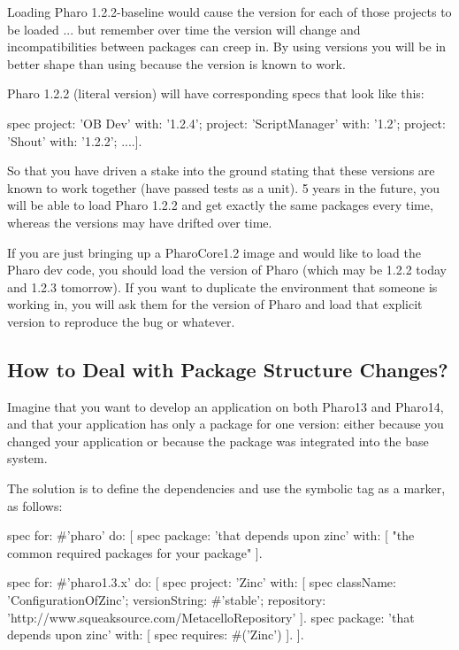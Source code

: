 \documentclass[a4paper,10pt,twoside]{book}
\begin{document}
Loading Pharo 1.2.2-baseline would cause the  version for each of those projects to be loaded ... 
but remember over time the  version will change and incompatibilities between packages can creep in. 
By using  versions you will be in better shape than using  because the  version is known to work.

Pharo 1.2.2 (literal version) will have corresponding specs that look like this:

\begin{code}{}
 spec
    project: 'OB Dev' with: '1.2.4';
    project: 'ScriptManager' with: '1.2';
    project: 'Shout' with: '1.2.2';
    ....].
\end{code}

So that you have driven a stake into the ground stating that these versions are known to work together (have passed tests as a unit). 5 years in the future, you will be able to load Pharo 1.2.2 and get exactly the same packages every time, whereas the  versions may have drifted over time.

If you are just bringing up a PharoCore1.2 image and would like to load the Pharo dev code, you should load the  version of Pharo (which may be 1.2.2 today and 1.2.3 tomorrow).
If you want to duplicate the environment that someone is working in, you will ask them for the version of Pharo and load that explicit version to reproduce the bug or whatever. 


\subsection{How to Deal with Package Structure Changes?}
Imagine that you want to develop an application on both Pharo13 and Pharo14, and that your application has only a package for one version: either because 
you changed your application or because the package was integrated into the base system. 

The solution is to define the dependencies and use the symbolic tag as a marker, as follows: 

\begin{code}{}
spec for: #'pharo' do: [
   spec package: 'that depends upon zinc' with: [
     "the common required packages for your package"
   ].
   
spec for: #'pharo1.3.x' do: [
   spec project: 'Zinc' with: [
       spec
           className: 'ConfigurationOfZinc';
           versionString: #'stable';
           repository: 'http://www.squeaksource.com/MetacelloRepository' ].
   spec package: 'that depends upon zinc' with: [
       spec requires: #('Zinc') ].
].
\end{code}
\end{document}
